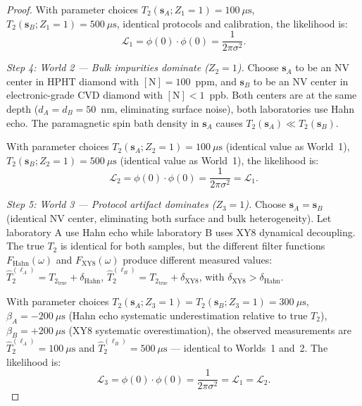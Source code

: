 \documentclass[11pt,a4paper]{article}
\theoremstyle{definition}
\newcommand{\Ttwo}{T_2}
\newcommand{\NV}{NV}
\begin{document}
\begin{proof}
With parameter choices $\Ttwo(\mathbf{s}_A; Z_1{=}1) = 100~\mu\text{s}$,
$\Ttwo(\mathbf{s}_B; Z_1{=}1) = 500~\mu\text{s}$, identical protocols
and calibration, the likelihood is:
\begin{equation}
    \mathcal{L}_1 = \phi(0) \cdot \phi(0) = \frac{1}{2\pi\sigma^2}.
\end{equation}

\medskip\noindent\textit{Step 4: World 2 — Bulk impurities dominate ($Z_2 = 1$).}
Choose $\mathbf{s}_A$ to be an \NV{} center in HPHT diamond with
$[\text{N}] = 100$~ppm, and $\mathbf{s}_B$ to be an \NV{} center in
electronic-grade CVD diamond with $[\text{N}] < 1$~ppb. Both centers are
at the same depth ($d_A = d_B = 50$~nm, eliminating surface noise),
both laboratories use Hahn echo. The paramagnetic spin bath density in
$\mathbf{s}_A$ causes $\Ttwo(\mathbf{s}_A) \ll \Ttwo(\mathbf{s}_B)$.

With parameter choices $\Ttwo(\mathbf{s}_A; Z_2{=}1) = 100~\mu\text{s}$
(identical value as World~1), $\Ttwo(\mathbf{s}_B; Z_2{=}1) = 500~\mu\text{s}$
(identical value as World~1), the likelihood is:
\begin{equation}
    \mathcal{L}_2 = \phi(0) \cdot \phi(0) = \frac{1}{2\pi\sigma^2} = \mathcal{L}_1.
\end{equation}

\medskip\noindent\textit{Step 5: World 3 — Protocol artifact dominates ($Z_3 = 1$).}
Choose $\mathbf{s}_A = \mathbf{s}_B$ (identical \NV{} center, eliminating
both surface and bulk heterogeneity). Let laboratory A use Hahn echo while
laboratory B uses XY8 dynamical decoupling. The true $\Ttwo$ is identical
for both samples, but the different filter functions $F_{\text{Hahn}}(\omega)$
and $F_{\text{XY8}}(\omega)$ produce different measured values:
$\widehat{T}_2^{(\ell_A)} = \Ttwo_{\text{true}} + \delta_{\text{Hahn}}$,
$\widehat{T}_2^{(\ell_B)} = \Ttwo_{\text{true}} + \delta_{\text{XY8}}$,
with $\delta_{\text{XY8}} > \delta_{\text{Hahn}}$.

With parameter choices $\Ttwo(\mathbf{s}_A; Z_3{=}1) = \Ttwo(\mathbf{s}_B; Z_3{=}1) = 300~\mu\text{s}$,
$\beta_A = -200~\mu\text{s}$ (Hahn echo systematic underestimation relative
to true $\Ttwo$), $\beta_B = +200~\mu\text{s}$ (XY8 systematic overestimation),
the observed measurements are $\widehat{T}_2^{(\ell_A)} = 100~\mu\text{s}$
and $\widehat{T}_2^{(\ell_B)} = 500~\mu\text{s}$ — identical to Worlds~1 and~2.
The likelihood is:
\begin{equation}
    \mathcal{L}_3 = \phi(0) \cdot \phi(0) = \frac{1}{2\pi\sigma^2} = \mathcal{L}_1 = \mathcal{L}_2.
\end{equation}


\end{proof}
\end{document}
